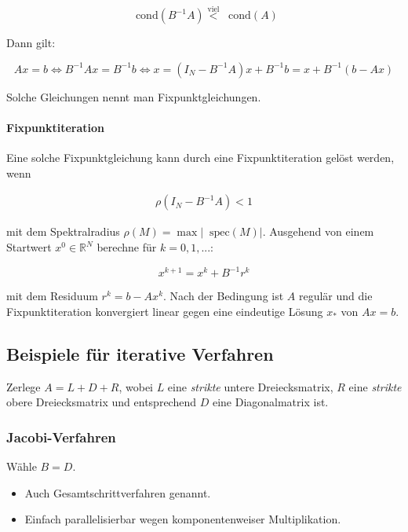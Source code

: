 \documentclass[a4paper, 14pt]{article}
\newcommand*\Spektrum{\mathop{}\!\mathrm{spec}}
\newcommand*\cond{\mathop{}\!\mathrm{cond}}
\begin{document}
	\begin{equation}
		\cond(B^{-1} A) \stackrel{\textrm{viel}}{<} \cond(A)
	\end{equation}

	Dann gilt:

	\begin{equation}
		A x = b \Leftrightarrow B^{-1} A x = B^{-1} b \Leftrightarrow x = (I_N - B^{-1} A)x + B^{-1} b = x + B^{-1} (b - A x)
	\end{equation}

	Solche Gleichungen nennt man Fixpunktgleichungen.

	\paragraph{Fixpunktiteration}

	Eine solche Fixpunktgleichung kann durch eine Fixpunktiteration gelöst werden, wenn

	\begin{align}
		\rho(I_N - B^{-1} A) < 1
	\end{align}

	mit dem Spektralradius $\rho(M) = \max | \Spektrum(M) |$.
	Ausgehend von einem Startwert $x^0 \in \mathbb{R}^N$ berechne für $k = 0, 1, ...$:

	\begin{equation}
		x^{k + 1} = x^k + B^{-1} r^k
	\end{equation}

	mit dem Residuum $r^k = b - A x^k$.
	Nach der Bedingung ist $A$ regulär und die Fixpunktiteration konvergiert linear gegen eine eindeutige Lösung $x_*$ von $Ax = b$.

	\subsection{Beispiele für iterative Verfahren}

	Zerlege $A = L + D +R$, wobei $L$ eine \emph{strikte} untere Dreiecksmatrix, $R$ eine \emph{strikte} obere Dreiecksmatrix und entsprechend $D$ eine Diagonalmatrix ist.

	\subsubsection{Jacobi-Verfahren}

	Wähle $B = D$.

	\begin{itemize}
		\item Auch Gesamtschrittverfahren genannt.
		\item Einfach parallelisierbar wegen komponentenweiser Multiplikation.
	\end{itemize}
\end{document}
